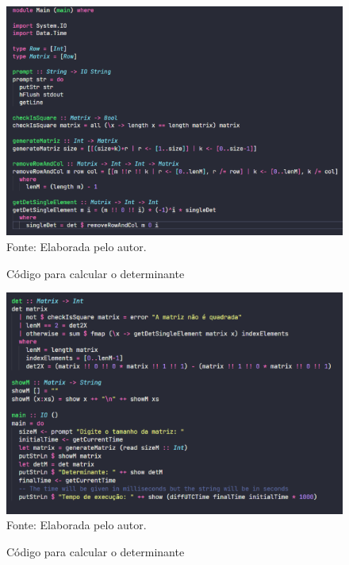 \documentclass[a4paper, 12pt]{article}
\begin{document}
    \begin{figure}[!ht]
        \centering
        \caption{Código para calcular o determinante}
        \includegraphics[scale=0.5]{codigo1.png} \\
        {\footnotesize Fonte: Elaborada pelo autor.}
        \label{fig:my_label}
    \end{figure}

    \begin{figure}[!ht]
        \centering
        \caption{Código para calcular o determinante}
        \includegraphics[scale=0.5]{codigo2.png} \\
        {\footnotesize Fonte: Elaborada pelo autor.}
        \label{fig:my_label}
    \end{figure}

   

\newpage
\end{document}
